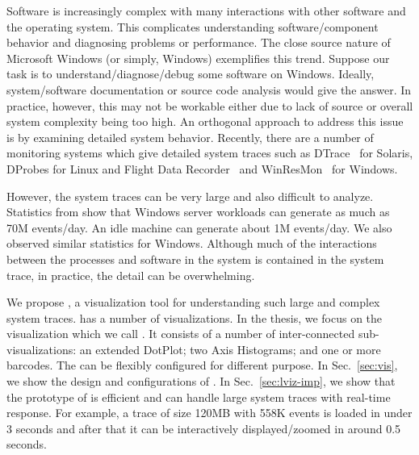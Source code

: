 
Software is increasingly complex with many interactions with other software
and the operating system.
This complicates understanding software/component behavior and diagnosing
problems or performance.
The close source nature of Microsoft Windows (or simply, Windows) exemplifies this trend.
Suppose our task is to understand/diagnose/debug some software on Windows.
Ideally, system/software documentation or source code
analysis would give the answer.
In practice, however, this may not be
workable either due to lack of source or overall
system complexity being too high.
An orthogonal approach to address this issue is by examining
detailed system behavior.
Recently, there are a number of monitoring systems which
give detailed system traces such as DTrace~\cite{cantrill2004dynamic} for Solaris,
DProbes for Linux and Flight Data Recorder~\cite{verbowski6flight}
and WinResMon~\cite{ramnath2006winresmon} for Windows.

However, the system traces can be very large and also
difficult to analyze. Statistics from \cite{verbowski6flight} show that Windows
server workloads can generate as much as 70M events/day.
An idle machine can generate about 1M events/day. We also
observed similar statistics for Windows. Although much of
the interactions between the processes and software in the
system is contained in the system trace, in practice, the detail
can be overwhelming.


We propose \lviz{}, a visualization tool for
understanding such large and complex system traces.
\lviz{} has a number of visualizations.
In the thesis, we focus on the visualization which we call \VDP{}.
It consists of a number of inter-connected sub-visualizations:
an extended DotPlot;
two Axis Histograms; and one or more barcodes.
The \VDP{} can be flexibly configured for different purpose.
In Sec.~\ref{sec:vis}, we show the design and configurations of \VDP{}.
In Sec.~\ref{sec:lviz-imp}, we show that
the prototype of \lviz{} is efficient and can handle large system traces
with real-time response. For example, a trace of size 120MB with 558K events 
is loaded in under 3 seconds
and after that it can be interactively displayed/zoomed in around 0.5 seconds.

